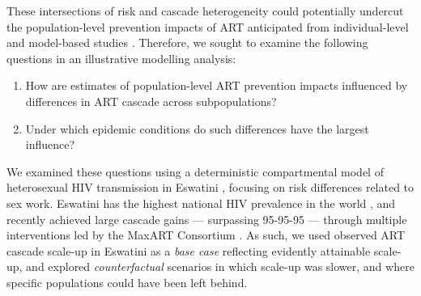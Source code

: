 These intersections of risk and cascade heterogeneity
could potentially undercut the population-level prevention impacts of ART
anticipated from individual-level and model-based studies \cite{Baral2019}.
Therefore, we sought to examine the following questions
in an illustrative modelling analysis:
\begin{enumerate}
  \item\label{obj:art.1} How are estimates of population-level ART prevention impacts
    influenced by differences in ART cascade across subpopulations?
  \item\label{obj:art.2} Under which epidemic conditions
    do such differences have the largest influence?
\end{enumerate}
We examined these questions using
a deterministic compartmental model of heterosexual HIV transmission in Eswatini \cite{Knight2019},
focusing on risk differences related to sex work.
Eswatini has the highest national HIV prevalence in the world \cite{UNAIDS2021},
and recently achieved large cascade gains --- surpassing 95-95-95 ---
through multiple interventions led by the MaxART Consortium \cite{Walsh2020,SHIMS3,AIDSinfo}.
As such, we used observed ART cascade scale-up in Eswatini as a \emph{base case}
reflecting evidently attainable scale-up,
and explored \emph{counterfactual} scenarios in which scale-up was slower,
and where specific populations could have been left behind.
